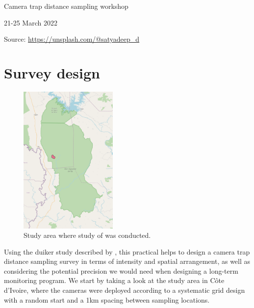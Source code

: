 \documentclass[a4paper, 10pt]{article}
\begin{document}
\phantom{a}

\vspace{4.7cm}

{\Large Camera trap distance sampling workshop}

{\large 21-25 March 2022}

\begin{flushright}
\tiny{Source: \url{https://unsplash.com/@satyadeep_d}}
\end{flushright}

%
{%
}



\section{Survey design}

\begin{figure}
\includegraphics[width=0.43\textwidth]{studyarea-map.png}
\caption{Study area where study of \citet{howeetal} was conducted. \label{fig:map}}
\vspace{-25pt}
\end{figure}

Using the duiker study described by \citet{howeetal}, this practical helps to design a camera trap distance sampling survey in terms of intensity and spatial arrangement, as well as considering the potential precision we would need when designing a long-term monitoring program. We start by taking a look at the study area in Côte d’Ivoire, where the cameras were deployed according to a systematic grid design with a random start and a 1km spacing between sampling locations.
\end{document}

